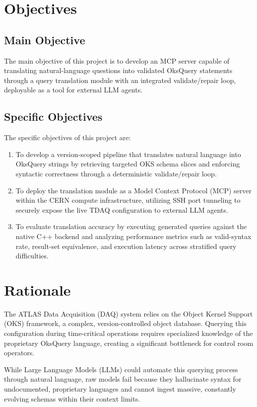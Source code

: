 \documentclass[12pt, a4paper]{report}
\begin{document}
\section{Objectives}

\subsection{Main Objective}
The main objective of this project is to develop an MCP server capable of translating natural-language questions into validated OksQuery statements through a query translation module with an integrated validate/repair loop, deployable as a tool for external LLM agents.

\subsection{Specific Objectives}
The specific objectives of this project are:
\begin{enumerate}[label=(\roman*)]
  \item To develop a version-scoped pipeline that translates natural language into OksQuery strings by retrieving targeted OKS schema slices and enforcing syntactic correctness through a deterministic validate/repair loop.
  \item To deploy the translation module as a Model Context Protocol (MCP) server within the CERN compute infrastructure, utilizing SSH port tunneling to securely expose the live TDAQ configuration to external LLM agents.
  \item To evaluate translation accuracy by executing generated queries against the native C++ backend and analyzing performance metrics such as valid-syntax rate, result-set equivalence, and execution latency across stratified query difficulties.
\end{enumerate}

\section{Rationale}

The ATLAS Data Acquisition (DAQ) system relies on the Object Kernel Support (OKS) framework, a complex, version-controlled object database. Querying this configuration during time-critical operations requires specialized knowledge of the proprietary OksQuery language, creating a significant bottleneck for control room operators.

While Large Language Models (LLMs) could automate this querying process through natural language, raw models fail because they hallucinate syntax for undocumented, proprietary languages and cannot ingest massive, constantly evolving schemas within their context limits.
\end{document}
